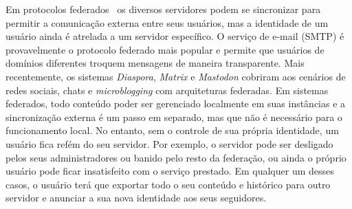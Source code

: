 \documentclass[12pt]{article}
\newcommand{\FC} {Freechains\xspace}
\begin{document}

Em protocolos federados~\cite{TODO} os diversos servidores podem se sincronizar
para permitir a comunicação externa entre seus usuários, mas a identidade de um
usuário ainda é atrelada a um servidor específico.
O serviço de e-mail (SMTP) é provavelmente o protocolo federado mais popular e
permite que usuários de domínios diferentes troquem mensagens de maneira
transparente.
Mais recentemente, os sistemas \emph{Diaspora}, \emph{Matrix} e \emph{Mastodon}
cobriram aos cenários de redes sociais, chats e \emph{microblogging} com
arquiteturas federadas.
Em sistemas federados, todo conteúdo poder ser gerenciado localmente em suas
instâncias e a sincronização externa é um passo em separado, mas que não é
necessário para o funcionamento local.
No entanto, sem o controle de sua própria identidade, um usuário fica refém do
seu servidor.
Por exemplo, o servidor pode ser desligado pelos seus administradores ou banido
pelo resto da federação, ou ainda o próprio usuário pode ficar insatisfeito com
o serviço prestado.
Em qualquer um desses casos, o usuário terá que exportar todo o seu conteúdo e
histórico para outro servidor e anunciar a sua nova identidade aos seus
seguidores.
\end{document}
